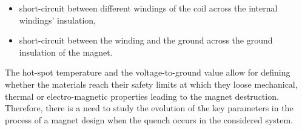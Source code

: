 \begin{itemize}
    \item short-circuit between different windings of the coil across the internal windings' insulation,
    \item short-circuit between the winding and the ground across the ground insulation of the magnet.
\end{itemize}

The hot-spot temperature and the voltage-to-ground value allow for defining whether the materials reach their safety limits at which they loose mechanical, thermal or electro-magnetic properties leading to the magnet destruction. Therefore, there is a need to study the evolution of the key parameters in the process of a magnet design when the quench occurs in the considered system.